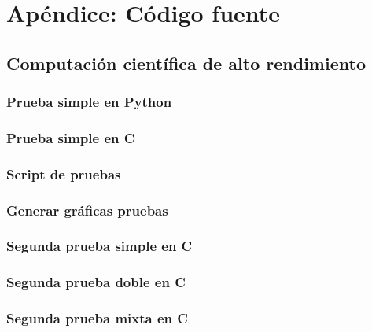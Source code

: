 \chapter{Apéndice: Código fuente}

\section{Computación científica de alto rendimiento}

\subsection{Prueba simple en Python}
\label{prueba:simple_python}


\newpage
\subsection{Prueba simple en C}
\label{prueba:simple_c}


\newpage
\subsection{Script de pruebas}


\newpage
\subsection{Generar gráficas pruebas}


\newpage
\subsection{Segunda prueba simple en C}
\label{prueba:simple_c2}


\newpage
\subsection{Segunda prueba doble en C}
\label{prueba:doble_c2}


\newpage
\subsection{Segunda prueba mixta en C}
\label{prueba:mixta_c2}


